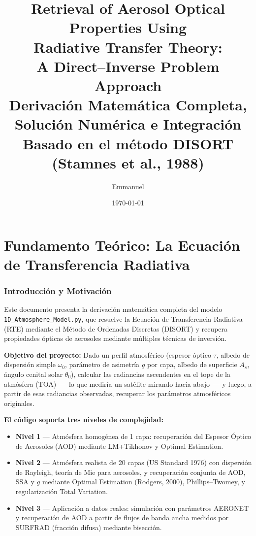 \documentclass[a4paper,11pt]{article}
\title{\textbf{Retrieval of Aerosol Optical Properties Using\\
Radiative Transfer Theory:\\
A Direct--Inverse Problem Approach}\\[0.5cm]
\large Derivaci\'on Matem\'atica Completa, Soluci\'on Num\'erica e Integraci\'on\\[0.3cm]
\normalsize Basado en el m\'etodo DISORT (Stamnes et al., 1988)}
\author{Emmanuel}
\date{\today}
\begin{document}
\maketitle
\tableofcontents
\newpage

\part{Fundamento Te\'orico: La Ecuaci\'on de Transferencia Radiativa}

\section{Introducci\'on y Motivaci\'on}

Este documento presenta la derivaci\'on matem\'atica completa del modelo
\texttt{1D\_Atmosphere\_Model.py}, que resuelve la Ecuaci\'on de Transferencia
Radiativa (RTE) mediante el M\'etodo de Ordenadas Discretas (DISORT) y recupera
propiedades \'opticas de aerosoles mediante m\'ultiples t\'ecnicas de inversi\'on.

\textbf{Objetivo del proyecto:} Dado un perfil atmosf\'erico (espesor \'optico $\tau$,
albedo de dispersi\'on simple $\omega_0$, par\'ametro de asimetr\'ia $g$ por capa,
albedo de superficie $A_s$, \'angulo cenital solar $\theta_0$), calcular las
radiancias ascendentes en el tope de la atm\'osfera (TOA) ---~lo que medir\'ia un
sat\'elite mirando hacia abajo~--- y luego, a partir de esas radiancias observadas,
recuperar los par\'ametros atmosf\'ericos originales.

\textbf{El c\'odigo soporta tres niveles de complejidad:}
\begin{itemize}
    \item \textbf{Nivel 1} --- Atm\'osfera homog\'enea de 1 capa: recuperaci\'on
          del Espesor \'Optico de Aerosoles (AOD) mediante LM+Tikhonov y Optimal
          Estimation.
    \item \textbf{Nivel 2} --- Atm\'osfera realista de 20 capas (US Standard 1976)
          con dispersi\'on de Rayleigh, teor\'ia de Mie para aerosoles, y
          recuperaci\'on conjunta de AOD, SSA y $g$ mediante Optimal Estimation
          (Rodgers, 2000), Phillips--Twomey, y regularizaci\'on Total Variation.
    \item \textbf{Nivel 3} --- Aplicaci\'on a datos reales: simulaci\'on con
          par\'ametros AERONET y recuperaci\'on de AOD a partir de flujos de banda
          ancha medidos por SURFRAD (fracci\'on difusa) mediante bisecci\'on.
\end{itemize}
\end{document}
